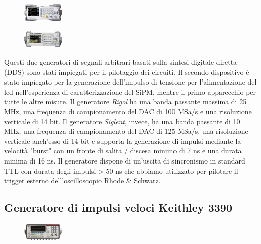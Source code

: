\documentclass[journal]{IEEEtran}
\begin{document}
\begin{figure}[h!]
  \centering
  \includegraphics[width=0.18\textwidth]{lab-reports/Schematics-and-graphics/RIGOL Gen.png}
\end{figure}

\begin{figure}[h!]
  \centering
  \includegraphics[width=0.18\textwidth]{lab-reports/Schematics-and-graphics/SIGLENT Gen.png}
\end{figure}

Questi due generatori di segnali arbitrari basati sulla sintesi digitale diretta (DDS) sono stati impiegati per il pilotaggio dei circuiti. Il secondo dispositivo è stato impiegato per la generazione dell'impulso di tensione per l'alimentazione del led nell'esperienza di caratterizzazione del SiPM, mentre il primo apparecchio per tutte le altre misure. Il generatore \textit{Rigol} ha una banda passante massima di 25 MHz, una frequenza di campionamento del DAC di 100 MSa/s e una risoluzione verticale di 14 bit. Il generatore \textit{Siglent}, invece, ha una banda passante di 10 MHz, una frequenza di campionamento del DAC di 125 MSa/s, una risoluzione verticale anch'esso di 14 bit e supporta la generazione di impulsi mediante la velocità "burst" con un fronte di salita / discesa minimo di 7 ns e una durata minima di 16 ns. Il generatore dispone di un'uscita di sincronismo in standard TTL con durata degli impulsi > 50 ns che abbiamo utilizzato per pilotare il trigger esterno dell'oscilloscopio Rhode & Schwarz. \cite{E} \cite{G}

\subsection{\textbf{Generatore di impulsi veloci Keithley 3390}}

\begin{figure}[h!]
  \centering
  \includegraphics[width=0.18\textwidth]{lab-reports/Schematics-and-graphics/KEIT Gen.png}
\end{figure}
\end{document}
